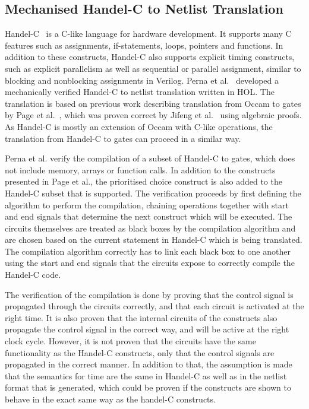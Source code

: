 \subsection{Mechanised Handel-C to Netlist Translation}%
\label{sec:bg:mechaniced-handel-c-to-netlist-translation}

Handel-C~\cite{bowen98_handel_c_languag_refer_manual} is a C-like language for
hardware development.  It supports many C features such as assignments,
if-statements, loops, pointers and functions.  In addition to these constructs,
Handel-C also supports explicit timing constructs, such as explicit parallelism
as well as sequential or parallel assignment, similar to blocking and
nonblocking assignments in Verilog.  Perna et
al.~\cite{perna12_mechan_wire_wise_verif_handel_c_synth} developed a
mechanically verified Handel-C to netlist translation written in HOL. The
translation is based on previous work describing translation from Occam to gates
by Page et al.~\cite{page91_compil_occam}, which was proven correct by Jifeng et
al.~\cite{jifeng93_towar} using algebraic proofs.  As Handel-C is mostly an
extension of Occam with C-like operations, the translation from Handel-C to
gates can proceed in a similar way.

Perna et al. verify the compilation of a subset of Handel-C to gates, which does
not include memory, arrays or function calls.  In addition to the constructs
presented in Page et al., the prioritised choice construct is also added to the
Handel-C subset that is supported.  The verification proceeds by first defining
the algorithm to perform the compilation, chaining operations together with
start and end signals that determine the next construct which will be executed.
The circuits themselves are treated as black boxes by the compilation algorithm
and are chosen based on the current statement in Handel-C which is being
translated.  The compilation algorithm correctly has to link each black box to
one another using the start and end signals that the circuits expose to
correctly compile the Handel-C code.

The verification of the compilation is done by proving that the control signal
is propagated through the circuits correctly, and that each circuit is activated
at the right time.  It is also proven that the internal circuits of the
constructs also propagate the control signal in the correct way, and will be
active at the right clock cycle.  However, it is not proven that the circuits
have the same functionality as the Handel-C constructs, only that the control
signals are propagated in the correct manner.  In addition to that, the
assumption is made that the semantics for time are the same in Handel-C as well
as in the netlist format that is generated, which could be proven if the
constructs are shown to behave in the exact same way as the handel-C constructs.

